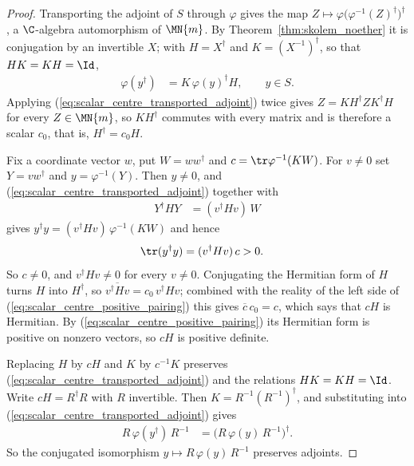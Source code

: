 \begin{proof}
    \leanok
    Transporting the adjoint of $S$ through $\varphi$ gives the map
    $Z\mapsto\varphi\bigl(\varphi^{-1}(Z)^\dagger\bigr)^\dagger$, a
    $\C$-algebra automorphism of $\MN{m}$. By
    Theorem~\ref{thm:skolem_noether} it is conjugation by an invertible $X$;
    with $H=X^\dagger$ and $K=(X^{-1})^\dagger$, so that $HK=KH=\Id$,
    \begin{align}
        \varphi(y^\dagger)
         & =K\,\varphi(y)^\dagger H,
        \qquad y\in S.
        \label{eq:scalar_centre_transported_adjoint}
    \end{align}
    Applying (\ref{eq:scalar_centre_transported_adjoint}) twice gives
    $Z=KH^\dagger ZK^\dagger H$ for every $Z\in\MN{m}$, so $KH^\dagger$
    commutes with every matrix and is therefore a scalar $c_0$, that is,
    $H^\dagger=c_0H$.

    Fix a coordinate vector $w$, put $W=ww^\dagger$ and
    $c=\tr\varphi^{-1}(KW)$. For $v\neq0$ set $Y=vw^\dagger$ and
    $y=\varphi^{-1}(Y)$. Then $y\neq0$, and
    (\ref{eq:scalar_centre_transported_adjoint}) together with
    \begin{align}
        Y^\dagger HY
         & =(v^\dagger Hv)\,W
        \label{eq:scalar_centre_rank_one_sandwich}
    \end{align}
    gives $y^\dagger y=(v^\dagger Hv)\,\varphi^{-1}(KW)$ and hence
    \begin{align}
        \tr(y^\dagger y)
         & =(v^\dagger Hv)\,c
           >0.
        \label{eq:scalar_centre_positive_pairing}
    \end{align}
    So $c\neq0$, and $v^\dagger Hv\neq0$ for every $v\neq0$. Conjugating the
    Hermitian form of $H$ turns $H$ into $H^\dagger$, so
    $\overline{v^\dagger Hv}=c_0\,v^\dagger Hv$; combined with the reality of
    the left side of (\ref{eq:scalar_centre_positive_pairing}) this gives
    $\overline{c}\,c_0=c$, which says that $cH$ is Hermitian. By
    (\ref{eq:scalar_centre_positive_pairing}) its Hermitian form is positive
    on nonzero vectors, so $cH$ is positive definite.

    Replacing $H$ by $cH$ and $K$ by $c^{-1}K$ preserves
    (\ref{eq:scalar_centre_transported_adjoint}) and the relations
    $HK=KH=\Id$. Write $cH=R^\dagger R$ with $R$ invertible. Then
    $K=R^{-1}(R^{-1})^\dagger$, and substituting into
    (\ref{eq:scalar_centre_transported_adjoint}) gives
    \begin{align}
        R\,\varphi(y^\dagger)\,R^{-1}
         & =\bigl(R\,\varphi(y)\,R^{-1}\bigr)^\dagger.
        \label{eq:scalar_centre_corrected_isomorphism}
    \end{align}
    So the conjugated isomorphism $y\mapsto R\,\varphi(y)\,R^{-1}$ preserves
    adjoints.
\end{proof}

